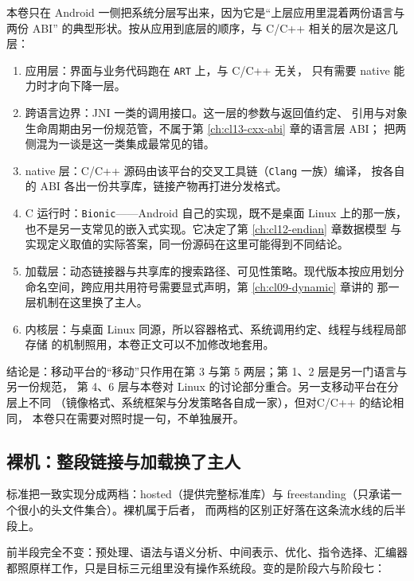 \documentclass[12pt,a4paper,fontset=fandol]{ctexbook}
\newcommand{\Lang}[1]{\textsf{#1}}
\newcommand{\CL}{\Lang{C}}
\newcommand{\CPP}{\Lang{C++}}
\newcommand{\Tool}[1]{\texttt{#1}}
\newcommand{\Mx}[1]{\textsf{#1}}
\newcommand{\Nix}{\textsf{Linux}}
\begin{document}
本卷只在 \Mx{Android} 一侧把系统分层写出来，因为它是“上层应用里混着两份语言与两份 ABI”
的典型形状。按从应用到底层的顺序，与 \CL/\CPP{} 相关的层次是这几层：

\begin{enumerate}
  \item 应用层：界面与业务代码跑在 \Tool{ART} 上，与 \CL/\CPP{} 无关，
        只有需要 native 能力时才向下降一层。
  \item 跨语言边界：\Mx{JNI} 一类的调用接口。这一层的参数与返回值约定、
        引用与对象生命周期由另一份规范管，不属于第 \ref{ch:cl13-cxx-abi} 章的语言层 ABI；
        把两侧混为一谈是这一类集成最常见的错。
  \item native 层：\CL/\CPP{} 源码由该平台的交叉工具链（\Tool{Clang} 一族）编译，
        按各自的 ABI 各出一份共享库，链接产物再打进分发格式。
  \item C 运行时：\Tool{Bionic}——\Mx{Android} 自己的实现，既不是桌面 \Nix{} 上的那一族，
        也不是另一支常见的嵌入式实现。它决定了第 \ref{ch:cl12-endian} 章数据模型
        与实现定义取值的实际答案，同一份源码在这里可能得到不同结论。
  \item 加载层：动态链接器与共享库的搜索路径、可见性策略。现代版本按应用划分
        命名空间，跨应用共用符号需要显式声明，第 \ref{ch:cl09-dynamic} 章讲的
        那一层机制在这里换了主人。
  \item 内核层：与桌面 \Nix{} 同源，所以容器格式、系统调用约定、线程与线程局部存储
        的机制照用，本卷正文可以不加修改地套用。
\end{enumerate}

结论是：移动平台的“移动”只作用在第 3 与第 5 两层；第 1、2 层是另一门语言与另一份规范，
第 4、6 层与本卷对 \Nix{} 的讨论部分重合。另一支移动平台在分层上不同
（镜像格式、系统框架与分发策略各自成一家），但对\CL/\CPP{} 的结论相同，
本卷只在需要对照时提一句，不单独展开。

\subsection{裸机：整段链接与加载换了主人}\label{sec:cl01-baremetal}

标准把一致实现分成两档：\Mx{hosted}（提供完整标准库）与
\Mx{freestanding}（只承诺一个很小的头文件集合）。裸机属于后者，
而两档的区别正好落在这条流水线的后半段上。

前半段完全不变：预处理、语法与语义分析、中间表示、优化、指令选择、汇编器
都照原样工作，只是目标三元组里没有操作系统段。变的是阶段六与阶段七：
\end{document}
